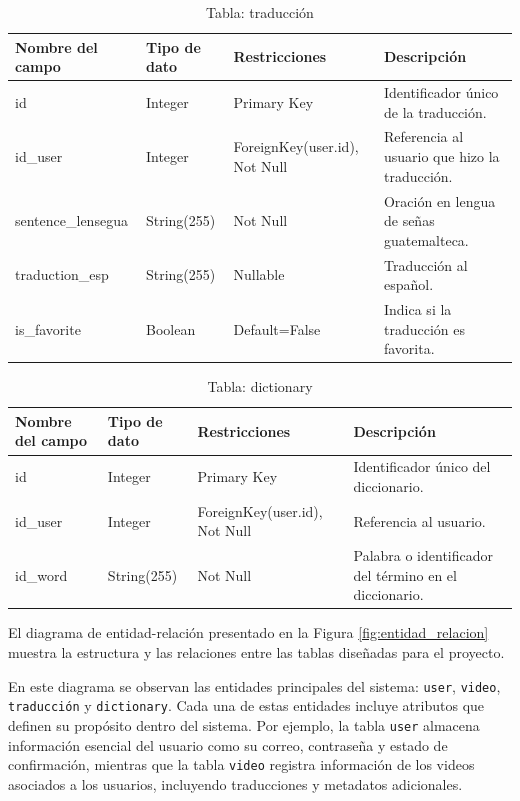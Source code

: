 \begin{table}[H]
\centering
\begin{tabularx}{\textwidth}{|l|l|l|X|}
\hline
\textbf{Nombre del campo} & \textbf{Tipo de dato} & \textbf{Restricciones} & \textbf{Descripción} \\ \hline
id                       & Integer               & Primary Key            & Identificador único de la traducción. \\ \hline
id\_user                 & Integer               & ForeignKey(user.id), Not Null & Referencia al usuario que hizo la traducción. \\ \hline
sentence\_lensegua       & String(255)           & Not Null                & Oración en lengua de señas guatemalteca. \\ \hline
traduction\_esp          & String(255)           & Nullable                & Traducción al español. \\ \hline
is\_favorite             & Boolean               & Default=False           & Indica si la traducción es favorita. \\ \hline
\end{tabularx}
\caption{Tabla: traducción}
\end{table}

\begin{table}[H]
\centering
\begin{tabularx}{\textwidth}{|l|l|l|X|}
\hline
\textbf{Nombre del campo} & \textbf{Tipo de dato} & \textbf{Restricciones} & \textbf{Descripción} \\ \hline
id                       & Integer               & Primary Key            & Identificador único del diccionario. \\ \hline
id\_user                 & Integer               & ForeignKey(user.id), Not Null & Referencia al usuario. \\ \hline
id\_word                 & String(255)           & Not Null                & Palabra o identificador del término en el diccionario. \\ \hline
\end{tabularx}
\caption{Tabla: dictionary}
\end{table}

El diagrama de entidad-relación presentado en la Figura \ref{fig:entidad_relacion} muestra la estructura y las relaciones entre las tablas diseñadas para el proyecto. 

En este diagrama se observan las entidades principales del sistema: \texttt{user}, \texttt{video}, \texttt{traducción} y \texttt{dictionary}. Cada una de estas entidades incluye atributos que definen su propósito dentro del sistema. Por ejemplo, la tabla \texttt{user} almacena información esencial del usuario como su correo, contraseña y estado de confirmación, mientras que la tabla \texttt{video} registra información de los videos asociados a los usuarios, incluyendo traducciones y metadatos adicionales.

